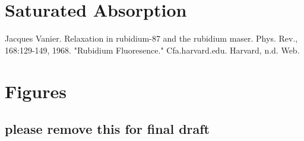 \documentclass[paper=a4, fontsize=11pt]{scrartcl} %
\numberwithin{equation}{section}
\numberwithin{figure}{section}
\numberwithin{table}{section}
\begin{document}
\section{Saturated Absorption}




\begin{thebibliography}{99}
Jacques Vanier. Relaxation in rubidium-87 and the
  rubidium maser. Phys. Rev., 168:129-149, 1968.
"Rubidium Fluoresence." Cfa.harvard.edu. Harvard, n.d. Web.
\end{thebibliography}



\section{Figures}

\subsection{please remove this for final draft}


\end{document}
